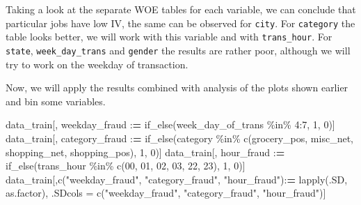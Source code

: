 \documentclass[
]{report}
\newenvironment{Shaded}{\begin{snugshade}}{\end{snugshade}}
\newcommand{\DecValTok}[1]{\textcolor[rgb]{0.00,0.00,0.81}{#1}}
\newcommand{\ErrorTok}[1]{\textcolor[rgb]{0.64,0.00,0.00}{\textbf{#1}}}
\newcommand{\FunctionTok}[1]{\textcolor[rgb]{0.00,0.00,0.00}{#1}}
\newcommand{\NormalTok}[1]{#1}
\newcommand{\OtherTok}[1]{\textcolor[rgb]{0.56,0.35,0.01}{#1}}
\newcommand{\SpecialCharTok}[1]{\textcolor[rgb]{0.00,0.00,0.00}{#1}}
\newcommand{\StringTok}[1]{\textcolor[rgb]{0.31,0.60,0.02}{#1}}
\begin{document}
Taking a look at the separate WOE tables for each variable, we can
conclude that particular jobs have low IV, the same can be observed for
\texttt{city}. For \texttt{category} the table looks better, we will
work with this variable and with \texttt{trans\_hour}. For
\texttt{state}, \texttt{week\_day\_trans} and \texttt{gender} the
results are rather poor, although we will try to work on the weekday of
transaction.

Now, we will apply the results combined with analysis of the plots shown
earlier and bin some variables.

\begin{Shaded}
\begin{Highlighting}[]
\NormalTok{data\_train[, weekday\_fraud }\SpecialCharTok{:}\ErrorTok{=} \FunctionTok{if\_else}\NormalTok{(week\_day\_of\_trans }\SpecialCharTok{\%in\%} \DecValTok{4}\SpecialCharTok{:}\DecValTok{7}\NormalTok{, }\DecValTok{1}\NormalTok{, }\DecValTok{0}\NormalTok{)]}
\NormalTok{data\_train[, category\_fraud }\SpecialCharTok{:}\ErrorTok{=} 
             \FunctionTok{if\_else}\NormalTok{(category }\SpecialCharTok{\%in\%} \FunctionTok{c}\NormalTok{(}\StringTok{\textquotesingle{}grocery\_pos\textquotesingle{}}\NormalTok{, }\StringTok{\textquotesingle{}misc\_net\textquotesingle{}}\NormalTok{, }\StringTok{\textquotesingle{}shopping\_net\textquotesingle{}}\NormalTok{, }\StringTok{\textquotesingle{}shopping\_pos\textquotesingle{}}\NormalTok{), }\DecValTok{1}\NormalTok{, }\DecValTok{0}\NormalTok{)]}
\NormalTok{data\_train[, hour\_fraud }\SpecialCharTok{:}\ErrorTok{=} 
             \FunctionTok{if\_else}\NormalTok{(trans\_hour }\SpecialCharTok{\%in\%} \FunctionTok{c}\NormalTok{(}\StringTok{\textquotesingle{}00\textquotesingle{}}\NormalTok{, }\StringTok{\textquotesingle{}01\textquotesingle{}}\NormalTok{, }\StringTok{\textquotesingle{}02\textquotesingle{}}\NormalTok{, }\StringTok{\textquotesingle{}03\textquotesingle{}}\NormalTok{, }\StringTok{\textquotesingle{}22\textquotesingle{}}\NormalTok{, }\StringTok{\textquotesingle{}23\textquotesingle{}}\NormalTok{), }\DecValTok{1}\NormalTok{, }\DecValTok{0}\NormalTok{)]}
\NormalTok{data\_train[,}\FunctionTok{c}\NormalTok{(}\StringTok{"weekday\_fraud"}\NormalTok{, }\StringTok{"category\_fraud"}\NormalTok{, }\StringTok{"hour\_fraud"}\NormalTok{)}\SpecialCharTok{:}\ErrorTok{=} 
             \FunctionTok{lapply}\NormalTok{(.SD, as.factor), .SDcols }\OtherTok{=} \FunctionTok{c}\NormalTok{(}\StringTok{"weekday\_fraud"}\NormalTok{, }\StringTok{"category\_fraud"}\NormalTok{, }\StringTok{"hour\_fraud"}\NormalTok{)]}
\end{Highlighting}
\end{Shaded}
\end{document}
